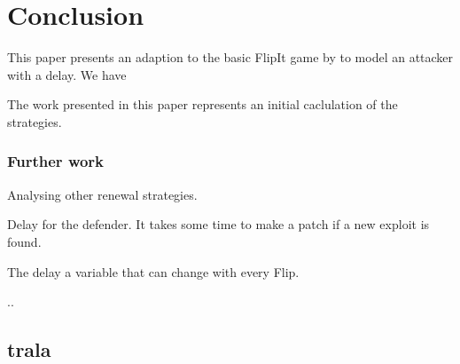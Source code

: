 \chapter{Conclusion}
\label{chapter5:conclusion}

This paper presents an adaption to the basic FlipIt game by \citep{FlipIt} to model an attacker with a delay.  We have 

The work presented in this paper represents an initial caclulation of the strategies. 
\subsection{Further work}

\begin{description}
\item Analysing other renewal strategies.
\item Delay for the defender. It takes some time to make a patch if a new exploit is found.
\item The delay a variable that can change with every Flip.
\item ..
\end{description}

\section{trala}
